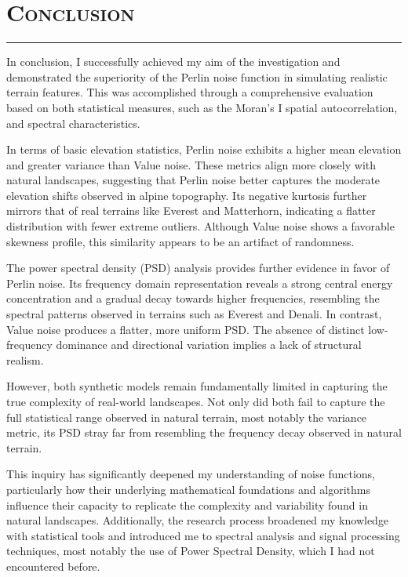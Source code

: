 \section{\textsc{Conclusion}}
\hrule height 0.5pt
\vspace*{2.5pt}

In conclusion, I successfully achieved my aim of the investigation and demonstrated the superiority of the Perlin noise function in 
simulating realistic terrain features. This was accomplished through a comprehensive evaluation based on both statistical measures, such 
as the Moran's I spatial autocorrelation, and spectral characteristics.

In terms of basic elevation statistics, Perlin noise exhibits a higher mean elevation and greater variance than Value noise. These metrics 
align more closely with natural landscapes, suggesting that Perlin noise better captures the moderate elevation shifts observed in alpine 
topography. Its negative kurtosis further mirrors that of real terrains like Everest and Matterhorn, indicating a flatter distribution with 
fewer extreme outliers. Although Value noise shows a favorable skewness profile, this similarity appears to be an artifact of randomness.

The power spectral density (PSD) analysis provides further evidence in favor of Perlin noise. Its frequency domain representation reveals 
a strong central energy concentration and a gradual decay towards higher frequencies, resembling the spectral patterns observed in terrains 
such as Everest and Denali. In contrast, Value noise produces a flatter, more uniform PSD. The absence of distinct low-frequency dominance 
and directional variation implies a lack of structural realism.

However, both synthetic models remain fundamentally limited in capturing the true complexity of real-world landscapes. Not only did both 
fail to capture the full statistical range observed in natural terrain, most notably the variance metric, its PSD stray far from resembling 
the frequency decay observed in natural terrain. 

This inquiry has significantly deepened my understanding of noise functions, particularly how their underlying mathematical foundations 
and algorithms influence their capacity to replicate the complexity and variability found in natural landscapes. Additionally, the research 
process broadened my knowledge with statistical tools and introduced me to spectral analysis and signal processing techniques, most notably 
the use of Power Spectral Density, which I had not encountered before.

